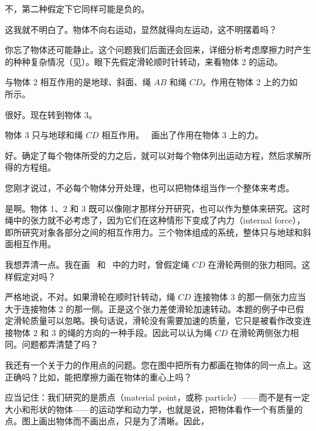 \begin{dialogue}
\tchr 不，第二种假定下它同样可能是负的。

\std 这我就不明白了。物体不向右运动，显然就得向左运动，这不明摆着吗？

\tchr 你忘了物体还可能静止。这个问题我们后面还会回来，详细分析考虑摩擦力时产生的种种复杂情况（见）。眼下先假定滑轮顺时针转动，来看物体 2 的运动。

\std 与物体 2 相互作用的是地球、斜面、绳 $AB$ 和绳 $CD$。作用在物体 2 上的力如~ 所示。

\tchr 很好。现在转到物体 3。

\std 物体 3 只与地球和绳 $CD$ 相互作用。~ 画出了作用在物体 3 上的力。

\tchr 好。确定了每个物体所受的力之后，就可以对每个物体列出运动方程，然后求解所得的方程组。

\std 您刚才说过，不必每个物体分开处理，也可以把物体组当作一个整体来考虑。

\tchr 是啊。物体 1、2 和 3 既可以像刚才那样分开研究，也可以作为整体来研究。这时绳中的张力就不必考虑了，因为它们在这种情形下变成了内力（internal force），即所研究对象各部分之间的相互作用力。三个物体组成的系统，整体只与地球和斜面相互作用。

\std 我想弄清一点。我在画~ 和~ 中的力时，曾假定绳 $CD$ 在滑轮两侧的张力相同。这样假定对吗？

\tchr 严格地说，不对。如果滑轮在顺时针转动，绳 $CD$ 连接物体 3 的那一侧张力应当大于连接物体 2 的那一侧。正是这个张力差使滑轮加速转动。本题的例子中已假定滑轮质量可以忽略。换句话说，滑轮没有需要加速的质量，它只是被看作改变连接物体 2 和 3 的绳的方向的一种手段。因此可以认为绳 $CD$ 在滑轮两侧张力相同。问题都弄清楚了吗？

\std 我还有一个关于力的作用点的问题。您在图中把所有力都画在物体的同一点上。这正确吗？比如，能把摩擦力画在物体的重心上吗？

\tchr 应当记住：我们研究的是质点（material point，或称 particle）——而不是有一定大小和形状的物体——的运动学和动力学，也就是说，把物体看作一个有质量的点。图上画出物体而不画出点，只是为了清晰。因此，


\end{dialogue}
